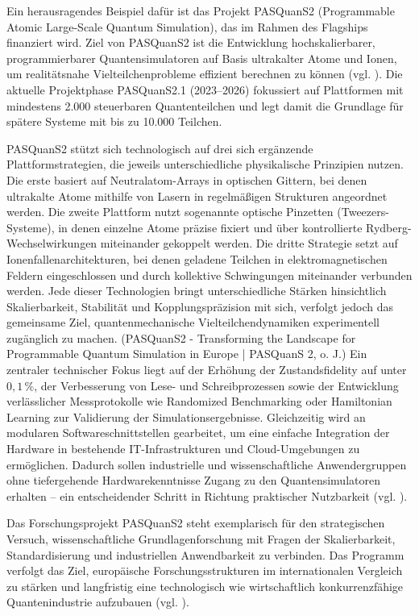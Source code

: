 Ein herausragendes Beispiel dafür ist das Projekt PASQuanS2 (Programmable Atomic Large-Scale Quantum Simulation), das im Rahmen des Flagships finanziert wird. Ziel von PASQuanS2 ist die Entwicklung hochskalierbarer, programmierbarer Quantensimulatoren auf Basis ultrakalter Atome und Ionen, um realitätsnahe Vielteilchenprobleme effizient berechnen zu können (vgl. \cite{rasanenPathEuropeanQuantum2021}). Die aktuelle Projektphase PASQuanS2.1 (2023–2026) fokussiert auf Plattformen mit mindestens 2.000 steuerbaren Quantenteilchen und legt damit die Grundlage für spätere Systeme mit bis zu 10.000 Teilchen. 

PASQuanS2 stützt sich technologisch auf drei sich ergänzende Plattformstrategien, die jeweils unterschiedliche physikalische Prinzipien nutzen. Die erste basiert auf Neutralatom-Arrays in optischen Gittern, bei denen ultrakalte Atome mithilfe von Lasern in regelmäßigen Strukturen angeordnet werden. Die zweite Plattform nutzt sogenannte optische Pinzetten (Tweezers-Systeme), in denen einzelne Atome präzise fixiert und über kontrollierte Rydberg-Wechselwirkungen miteinander gekoppelt werden. Die dritte Strategie setzt auf Ionenfallenarchitekturen, bei denen geladene Teilchen in elektromagnetischen Feldern eingeschlossen und durch kollektive Schwingungen miteinander verbunden werden. Jede dieser Technologien bringt unterschiedliche Stärken hinsichtlich Skalierbarkeit, Stabilität und Kopplungspräzision mit sich, verfolgt jedoch das gemeinsame Ziel, quantenmechanische Vielteilchendynamiken experimentell zugänglich zu machen. \cite{}(PASQuanS2 - Transforming the Landscape for Programmable Quantum Simulation in Europe | PASQuanS 2, o. J.) Ein zentraler technischer Fokus liegt auf der Erhöhung der Zustandsfidelity auf unter \(0{,}1\,\%\), der Verbesserung von Lese- und Schreibprozessen sowie der Entwicklung verlässlicher Messprotokolle wie Randomized Benchmarking oder Hamiltonian Learning zur Validierung der Simulationsergebnisse. Gleichzeitig wird an modularen Softwareschnittstellen gearbeitet, um eine einfache Integration der Hardware in bestehende IT-Infrastrukturen und Cloud-Umgebungen zu ermöglichen. Dadurch sollen industrielle und wissenschaftliche Anwendergruppen ohne tiefergehende Hardwarekenntnisse Zugang zu den Quantensimulatoren erhalten – ein entscheidender Schritt in Richtung praktischer Nutzbarkeit (vgl. \cite{rasanenPathEuropeanQuantum2021}).

Das Forschungsprojekt PASQuanS2 steht exemplarisch für den strategischen Versuch, wissenschaftliche Grundlagenforschung mit Fragen der Skalierbarkeit, Standardisierung und industriellen Anwendbarkeit zu verbinden. Das Programm verfolgt das Ziel, europäische Forschungsstrukturen im internationalen Vergleich zu stärken und langfristig eine technologisch wie wirtschaftlich konkurrenzfähige Quantenindustrie aufzubauen (vgl. \cite{vogiatzoglouEUsQuestDigital2025}).
 

